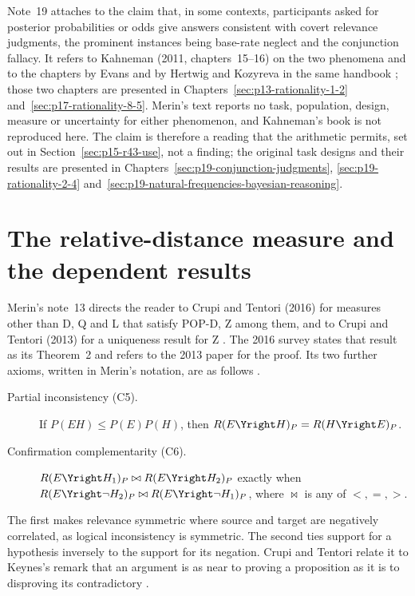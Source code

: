 Note~19 attaches to the claim that, in some contexts, participants
asked for posterior probabilities or odds give answers consistent with
covert relevance judgments, the prominent instances being base-rate
neglect and the conjunction fallacy. It refers to Kahneman (2011,
chapters~15--16) on the two phenomena and to the chapters by Evans and
by Hertwig and Kozyreva in the same handbook
\cite[p.~273 and p.~274, n.~19]{Merin2021Relevance}; those two
chapters are presented in Chapters~\ref{sec:p13-rationality-1-2}
and~\ref{sec:p17-rationality-8-5}. Merin's text reports no task,
population, design, measure or uncertainty for either phenomenon, and
Kahneman's book is not reproduced here. The claim is therefore a
reading that the arithmetic permits, set out in
Section~\ref{sec:p15-r43-use}, not a finding; the original task
designs and their results are presented in
Chapters~\ref{sec:p19-conjunction-judgments},
\ref{sec:p19-rationality-2-4}
and~\ref{sec:p19-natural-frequencies-bayesian-reasoning}.

\section{The relative-distance measure and the dependent results}
\label{sec:p15-w02b-p15-024-dependents}

Merin's note~13 directs the reader to Crupi and Tentori (2016) for
measures other than D, Q and L that satisfy POP-D, Z among them, and to
Crupi and Tentori (2013) for a uniqueness result for Z
\cite[p.~274, n.~13]{Merin2021Relevance}. The 2016 survey states that
result as its Theorem~2 and refers to the 2013 paper for the proof. Its
two further axioms, written in Merin's notation, are as follows
\cite[pp.~658--659]{CrupiTentori2016Confirmation}.
\begin{description}
\item[Partial inconsistency (C5).] If \(P(EH)\leq P(E)P(H)\), then
  \(R(E\Yright H)_P=R(H\Yright E)_P\).
\item[Confirmation complementarity (C6).]
  \(R(E\Yright H_1)_P\bowtie R(E\Yright H_2)_P\) exactly when
  \(R(E\Yright\neg H_2)_P\bowtie R(E\Yright\neg H_1)_P\), where
  \(\bowtie\) is any of \(<,=,>\).
\end{description}
The first makes relevance symmetric where source and target are
negatively correlated, as logical inconsistency is symmetric. The second
ties support for a hypothesis inversely to the support for its negation.
Crupi and Tentori relate it to Keynes's remark that an argument is as
near to proving a proposition as it is to disproving its contradictory
\cite[p.~659]{CrupiTentori2016Confirmation}.

